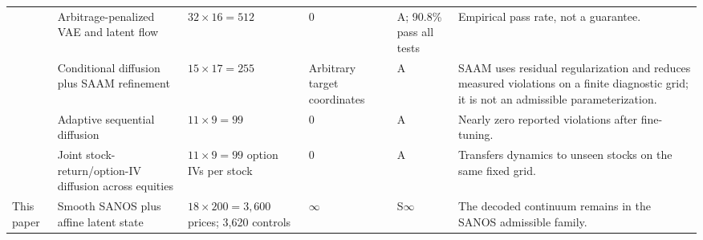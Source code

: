 \begin{landscape}
\begin{table}[p]
\begin{tabular}{@{}L{4.3cm}L{4.2cm}L{3.6cm}L{2.7cm}L{3.0cm}L{6.0cm}@{}}
\citet{BrooksEtAl2026}
  & Arbitrage-penalized VAE and latent flow & $32\times16=512$ & 0 & A; 90.8\% pass all tests & Empirical pass rate, not a guarantee. \\
\citet{HaoJi2026}
  & Conditional diffusion plus SAAM refinement & $15\times17=255$ & Arbitrary target coordinates & A & SAAM uses residual regularization and reduces measured violations on a finite diagnostic grid; it is not an admissible parameterization. \\
\citet{HanEtAl2026}
  & Adaptive sequential diffusion & $11\times9=99$ & 0 & A & Nearly zero reported violations after fine-tuning. \\
\citet{YangWangZhangLi2026}
  & Joint stock-return/option-IV diffusion across equities & $11\times9=99$ option IVs per stock & 0 & A & Transfers dynamics to unseen stocks on the same fixed grid. \\
This paper
  & Smooth SANOS plus affine latent state & $18\times200=3{,}600$ prices; 3,620 controls & $\infty$ & S$\infty$ & The decoded continuum remains in the SANOS admissible family. \\
\bottomrule
\end{tabular}
\end{table}
\end{landscape}

